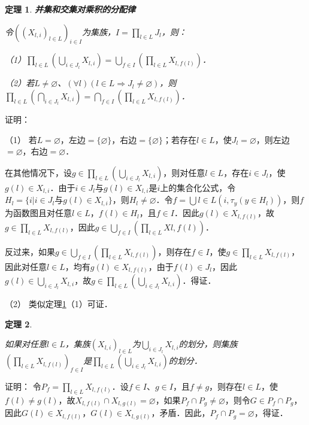 \documentclass[12pt, a4paper, oneside]{book}
\newtheorem{theo}{定理}
\begin{document}
			\begin{theo}\label{theo49}
				\textbf{并集和交集对乘积的分配律}
				\par
				令$((X_{l, i})_{l\in L})_{i\in I}$为集族，$I=\prod\limits_{l\in L}J_l$，则：
				\par
				（1）$\prod\limits_{l\in L}(\bigcup\limits_{i\in J_l}X_{l, i})=\bigcup\limits_{f\in I}(\prod\limits_{l\in L}X_{l, f(l)})$．
				\par
				（2）若$L\neq \varnothing$、$(\forall l)(l\in L\Rightarrow J_l\neq \varnothing)$，则$\prod\limits_{l\in L}(\bigcap\limits_{i\in J_l}X_{l, i})=\bigcap\limits_{f\in I}(\prod\limits_{l\in L}X_{l, f(l)})$．
			\end{theo}
			证明：
			\par
			（1）	若$L=\varnothing$，左边$=\{\varnothing\}$，右边$=\{\varnothing\}$；若存在$l\in L$，使$J_l=\varnothing$，则左边$=\varnothing$，右边$=\varnothing$．
			\par
			在其他情况下，设$g\in \prod\limits_{l\in L}(\bigcup\limits_{i\in J_l}X_{l, i})$，则对任意$l\in L$，存在$i\in J_l$，使$g(l)\in X_{l, i}$．由于$i\in J_l\text{与}g(l)\in X_{l, i}$是$i$上的集合化公式，令$H_l=\{i|i\in J_l\text{与}g(l)\in X_{l, i}\}$，则$H_l\neq \varnothing$．令$f=\bigcup{l\in L}(i, \tau_y(y\in H_l))$，则$f$为函数图且对任意$l\in L$，$f(l) \in H_l$，且$f\in I$．因此$g(l)\in X_{l, f(l)}$，故$g\in \prod\limits_{l\in L}X_{l, f(l)}$，因此$g\in \bigcup\limits_{f\in I}(\prod\limits_{l\in L}X{l, f(l)})$．
			\par
			反过来，如果$g\in \bigcup\limits_{f\in I}(\prod\limits_{l\in L}X_{l, f(l)})$，则存在$f\in I$，使$g\in \prod\limits_{l\in L}X_{l, f(l)}$，因此对任意$l\in L$，均有$g(l)\in X_{l, f(l)}$，由于$f(l)\in J_l$，因此$g(l)\in \bigcup\limits_{i\in J_l}X_{l, i}$，故$g\in \prod\limits_{l\in L}(\bigcup\limits_{i\in J_l}X_{l, i})$．得证．
			\par			
			（2）	类似定理\ref{theo49}（1）可证．
			
			\begin{theo}\label{theo50}
				\hfill\par
				如果对任意$l\in L$，集族$(X_{l, i})_{l\in L}$为$\bigcup\limits_{i\in J_l}X_{l, i}$的划分，则集族$(\prod\limits_{l\in L}X_{l, f(l)})_{f\in I}$是$\prod\limits_{l\in L}(\bigcup\limits_{i\in J_l}X_{l, i})$的划分．
			\end{theo}
			证明：
			令$P_f=\prod\limits_{l\in L}X_{l, f(l)}$．设$f\in I$、$g\in I$，且$f\neq g$，则存在$l\in L$，使$f(l)\neq g(l)$，故$X_{l, f(l)}\cap X_{l, g(l)}=\varnothing$，如果$P_f\cap P_g\neq \varnothing$，则令$G\in P_f\cap P_g$，因此$G(l)\in X_{l, f(l)}$，$G(l)\in X_{l, g(l)}$，矛盾．因此，$P_f\cap P_g=\varnothing$，得证．
						
\end{document}
